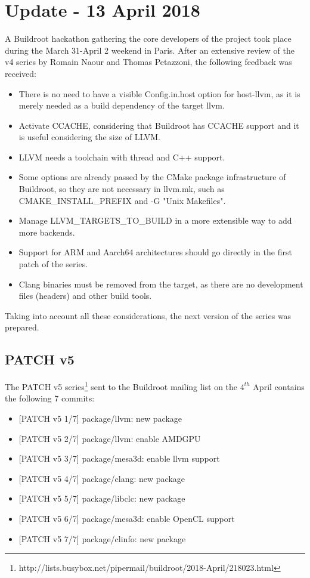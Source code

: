 \documentclass[12pt,a4paper,oneside]{article}
\begin{document}
\section*{Update - 13 April 2018}
A Buildroot hackathon gathering the core developers of the project took place
during the March 31-April 2 weekend in Paris. After an extensive review of the
v4 series by Romain Naour and Thomas Petazzoni, the following feedback was
received:
\begin{itemize}
  \item There is no need to have a visible Config.in.host option for host-llvm,
  as it is merely needed as a build dependency of the target llvm.
  \item Activate CCACHE, considering that Buildroot has CCACHE support and it
  is useful considering the size of LLVM.
  \item LLVM needs a toolchain with thread and C++ support.
  \item Some options are already passed by the CMake package infrastructure of
  Buildroot, so they are not necessary in llvm.mk, such as CMAKE\_INSTALL\_PREFIX
  and -G "Unix Makefiles".
  \item Manage LLVM\_TARGETS\_TO\_BUILD in a more extensible way to add more backends.
  \item Support for ARM and Aarch64 architectures should go directly in the
  first patch of the series.
  \item Clang binaries must be removed from the target, as there are no development
  files (headers) and other build tools.
\end{itemize}
Taking into account all these considerations, the next version of the series
was prepared.

\subsection*{PATCH v5}
The PATCH v5 series\footnote{http://lists.busybox.net/pipermail/buildroot/2018-April/218023.html}
sent to the Buildroot mailing list on the $4^{th}$ April contains the  following
7 commits:
\begin{itemize}
  \item {[PATCH v5 1/7]} package/llvm: new package
  \item {[PATCH v5 2/7]} package/llvm: enable AMDGPU
  \item {[PATCH v5 3/7]} package/mesa3d: enable llvm support
  \item {[PATCH v5 4/7]} package/clang: new package
  \item {[PATCH v5 5/7]} package/libclc: new package
  \item {[PATCH v5 6/7]} package/mesa3d: enable OpenCL support
  \item {[PATCH v5 7/7]} package/clinfo: new package
\end{itemize}
\newpage
\end{document}
